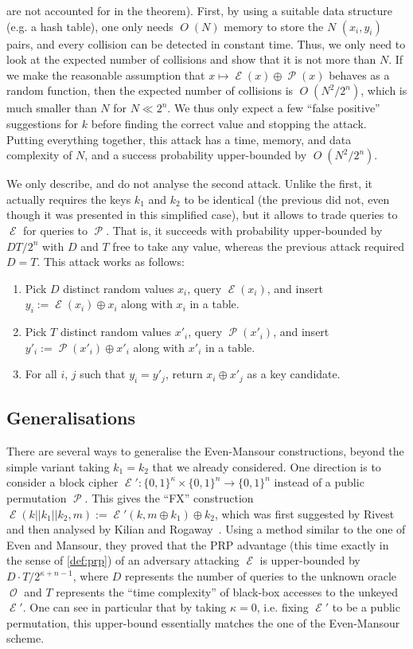 \documentclass[11pt,a4paper]{article}
\theoremstyle{definition}
\DeclareMathOperator\E{\mathcal{E}}
\DeclareMathOperator\Perm{\mathcal{P}}
\DeclareMathOperator\ora{\mathcal{O}}
\DeclareMathOperator\bigo{\mathit{O}}
\newcommand\msb{\{0,1\}^n}
\newcommand\ksb{\{0,1\}^\kappa}
\begin{document}
are not accounted for in the theorem).
First, by using a suitable data structure (e.g. a hash table), one only needs $\bigo(N)$ memory to store
the $N$ $(x_i, y_i)$ pairs, and every collision can be detected in constant time. Thus, we only need to look at the expected
number of collisions and show that it is not more than $N$. If we make the reasonable assumption
that $x \mapsto \E(x) \oplus \Perm(x)$ behaves as a random function, then the expected number of collisions is $\bigo(N^2/2^n)$,
which is much smaller than $N$ for $N \ll 2^n$. We thus only expect a few ``false positive'' suggestions for $k$ before finding
the correct value and stopping the attack.
Putting everything together, this attack has a time, memory, and data complexity of $N$, and a success probability upper-bounded
by $\bigo(N^2/2^n)$.

We only describe, and do not analyse the second attack. Unlike the first, it actually requires the keys $k_1$ and $k_2$ to be identical
(the previous did not, even though it was presented in this simplified case), but it allows to trade queries to $\E$ for queries
to $\Perm$. That is, it succeeds with probability upper-bounded by $DT/2^n$ with $D$ and $T$ free to take any value, whereas the previous
attack required $D = T$. This attack works as follows:
\begin{enumerate}
\item Pick $D$ distinct random values $x_i$, query $\E(x_i)$, and insert $y_i := \E(x_i) \oplus x_i$ along with $x_i$ in a table.
\item Pick $T$ distinct random values $x'_i$, query $\Perm(x'_i)$, and insert $y'_i := \Perm(x'_i) \oplus x'_i$ along with $x'_i$ in a table.
\item For all $i$, $j$ such that $y_i = y'_j$, return $x_i \oplus x'_j$ as a key candidate.
\end{enumerate}


\subsection{Generalisations}

There are several ways to generalise the Even-Mansour constructions, beyond the simple variant taking $k_1 = k_2$ that we already considered.
One direction is to consider a block cipher $\E' : \ksb \times \msb \rightarrow \msb$
instead of a public permutation $\Perm$. This gives the ``FX'' construction $\E(k||k_1||k_2,m)
:= \E'(k, m \oplus k_1) \oplus k_2$, which was first suggested by Rivest and then analysed by Kilian and Rogaway~\cite{DBLP:journals/joc/KilianR01}. Using a method
similar to the one of Even and Mansour, they proved that the PRP advantage (this time exactly in the sense of \autoref{def:prp})
of an adversary attacking $\E$ is upper-bounded
by $D\cdot T / 2^{\kappa + n - 1}$, where $D$  represents the number of queries to the unknown oracle $\ora$ and $T$ represents the ``time
complexity'' of black-box accesses to the unkeyed $\E'$. One can see in particular that by taking $\kappa = 0$, i.e. fixing $\E'$ to be
a public permutation, this upper-bound essentially matches the one of the Even-Mansour scheme.
\end{document}
